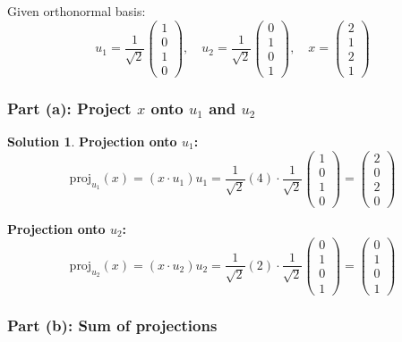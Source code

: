 \documentclass[12pt]{article}
\theoremstyle{definition}
\newtheorem{solution}{Solution}
\begin{document}
Given orthonormal basis:
\[
u_1 = \frac{1}{\sqrt{2}}\begin{pmatrix} 1 \\ 0 \\ 1 \\ 0 \end{pmatrix}, \quad
u_2 = \frac{1}{\sqrt{2}}\begin{pmatrix} 0 \\ 1 \\ 0 \\ 1 \end{pmatrix}, \quad
x = \begin{pmatrix} 2 \\ 1 \\ 2 \\ 1 \end{pmatrix}
\]

\subsubsection*{Part (a): Project $x$ onto $u_1$ and $u_2$}

\begin{solution}
\textbf{Projection onto $u_1$:}
\[
\text{proj}_{u_1}(x) = (x \cdot u_1) u_1 = \frac{1}{\sqrt{2}}(4) \cdot \frac{1}{\sqrt{2}}\begin{pmatrix} 1 \\ 0 \\ 1 \\ 0 \end{pmatrix} = \begin{pmatrix} 2 \\ 0 \\ 2 \\ 0 \end{pmatrix}
\]

\textbf{Projection onto $u_2$:}
\[
\text{proj}_{u_2}(x) = (x \cdot u_2) u_2 = \frac{1}{\sqrt{2}}(2) \cdot \frac{1}{\sqrt{2}}\begin{pmatrix} 0 \\ 1 \\ 0 \\ 1 \end{pmatrix} = \begin{pmatrix} 0 \\ 1 \\ 0 \\ 1 \end{pmatrix}
\]
\end{solution}

\subsubsection*{Part (b): Sum of projections}
\end{document}
